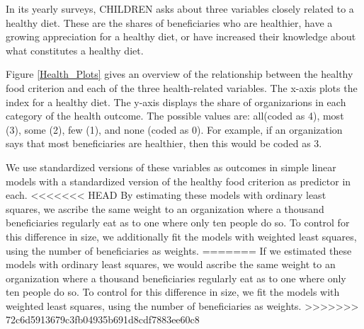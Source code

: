 \documentclass[12pt, a4paper, titlepage]{article}\usepackage[]{graphicx}\usepackage[]{color}
\begin{document}
In its yearly surveys, CHILDREN asks about three variables closely related to a healthy diet. These are the shares of beneficiaries who are healthier, have a growing appreciation for a healthy diet, or have increased their knowledge about what constitutes a healthy diet.

Figure \ref{Health_Plots} gives an overview of the relationship between the healthy food criterion and each of the three health-related variables. The x-axis plots the index for a healthy diet. The y-axis displays the share of organizarions in each category of the health outcome. The possible values are: all(coded as 4), most (3), some (2), few (1), and none (coded as 0). For example, if an organization says that most beneficiaries are healthier, then this would be coded as 3.

We use standardized versions of these variables as outcomes in simple linear models with a standardized version of the healthy food criterion as predictor in each.
<<<<<<< HEAD
By estimating these models with ordinary least squares, we ascribe the same weight to an organization where a thousand beneficiaries regularly eat as to one where only ten people do so. To control for this difference in size, we additionally fit the models with weighted least squares, using the number of beneficiaries as weights. 
=======
If we estimated these models with ordinary least squares, we would ascribe the same weight to an organization where a thousand beneficiaries regularly eat as to one where only ten people do so. To control for this difference in size, we fit the models with weighted least squares, using the number of beneficiaries as weights. 
>>>>>>> 72c6d5913679c3fb04935b691d8cdf7883ee60c8
\end{document}
